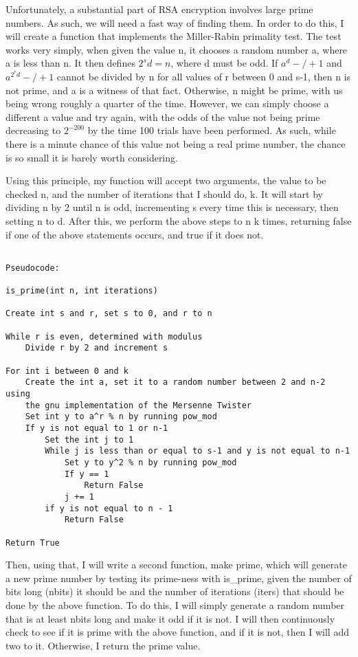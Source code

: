 \documentclass[11pt]{article}
\begin{document}
Unfortunately, a substantial part of RSA encryption involves large prime numbers. As such, we will need a fast way of finding them. In order to do this, I will create a function that implements the Miller-Rabin primality test. The test works very simply, when given the value n, it chooses a random number a, where a is less than n. It then defines $2^sd = n$, where d must be odd. If $a^d -/+ 1$ and $a^{2^rd} -/+ 1$ cannot be divided by n for all values of r between 0 and s-1, then n is not prime, and a is a witness of that fact. Otherwise, n might be prime, with us being wrong roughly a quarter of the time. However, we can simply choose a different a value and try again, with the odds of the value not being prime decreasing to $2^{-200}$ by the time 100 trials have been performed. As such, while there is a minute chance of this value not being a real prime number, the chance is so small it is barely worth considering.

Using this principle, my function will accept two arguments, the value to be checked n, and the number of iterations that I should do, k. It will start by dividing n by 2 until n is odd, incrementing s every time this is necessary, then setting n to d. After this, we perform the above steps to n k times, returning false if one of the above statements occurs, and true if it does not.

\begin{verbatim}

Pseudocode:

is_prime(int n, int iterations)

Create int s and r, set s to 0, and r to n

While r is even, determined with modulus
    Divide r by 2 and increment s

For int i between 0 and k
    Create the int a, set it to a random number between 2 and n-2 using
    the gnu implementation of the Mersenne Twister
    Set int y to a^r % n by running pow_mod
    If y is not equal to 1 or n-1
        Set the int j to 1
        While j is less than or equal to s-1 and y is not equal to n-1
            Set y to y^2 % n by running pow_mod
            If y == 1
                Return False
            j += 1
        if y is not equal to n - 1
            Return False

Return True

\end{verbatim}

Then, using that, I will write a second function, make prime, which will generate a new prime number by testing its prime-ness with is\_prime, given the number of bits long (nbits) it should be and the number of iterations (iters) that should be done by the above function. To do this, I will simply generate a random number that is at least nbits long and make it odd if it is not. I will then continuously check to see if it is prime with the above function, and if it is not, then I will add two to it. Otherwise, I return the prime value.
\end{document}

